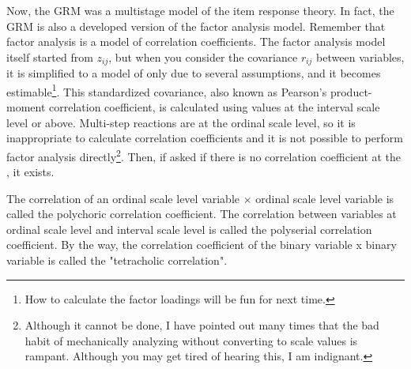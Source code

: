 \documentclass{ltjsbook}
\begin{document}
Now, the GRM was a multistage model of the item response theory. In fact, the GRM is also a developed version of the factor analysis model.
Remember that factor analysis is a model of correlation coefficients. The factor analysis model itself started from $z_{ij}$, but when you consider the covariance $r_{ij}$ between variables, it is simplified to a model of only  due to several assumptions, and it becomes estimable\footnote{How to calculate the factor loadings will be fun for next time.}. This standardized covariance, also known as Pearson's product-moment correlation coefficient, is calculated using values at the interval scale level or above. Multi-step reactions are at the ordinal scale level, so it is inappropriate to calculate correlation coefficients and it is not possible to perform factor analysis directly\footnote{Although it cannot be done, I have pointed out many times that the bad habit of mechanically analyzing without converting to scale values is rampant. Although you may get tired of hearing this, I am indignant.}. Then, if asked if there is no correlation coefficient at the , it exists.

The correlation of an ordinal scale level variable $\times$ ordinal scale level variable is called the polychoric correlation coefficient.
The correlation between variables at ordinal scale level and interval scale level is called the polyserial correlation coefficient.
By the way, the correlation coefficient of the binary variable x binary variable is called the "tetracholic correlation".
\end{document}

